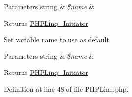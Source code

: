 \begin{DoxyParams}[1]{\-Parameters}
string & {\em \$name} & \\
\hline
\end{DoxyParams}
\begin{DoxyReturn}{\-Returns}
\hyperlink{class_p_h_p_linq___initiator}{\-P\-H\-P\-Linq\-\_\-\-Initiator} 
\end{DoxyReturn}
\-Set variable name to use as default


\begin{DoxyParams}[1]{\-Parameters}
string & {\em \$name} & \\
\hline
\end{DoxyParams}
\begin{DoxyReturn}{\-Returns}
\hyperlink{class_p_h_p_linq___initiator}{\-P\-H\-P\-Linq\-\_\-\-Initiator}
\end{DoxyReturn}


\-Definition at line 48 of file \-P\-H\-P\-Linq.\-php.


\begin{DoxyCode}
                         {
        return new PHPLinq_Initiator($name);
}

// Create easy-to-use initiator ("from")
if (!function_exists('from')) {
        function from($name) {
                return linqfrom($name);
        }
} else {
\end{DoxyCode}

